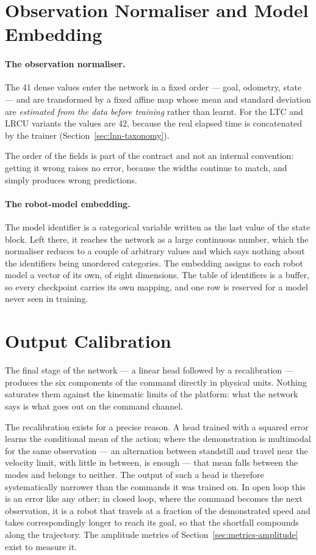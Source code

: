\section{Observation Normaliser and Model Embedding}
\label{sec:aux-modules}

\paragraph{The observation normaliser.}
The \num{41} dense values enter the network in a fixed order --- goal, odometry,
state --- and are transformed by a fixed affine map whose mean and standard
deviation are \emph{estimated from the data before training} rather than learnt.
For the LTC and LRCU variants the values are \num{42}, because the real elapsed
time is concatenated by the trainer (Section~\ref{sec:lnn-taxonomy}).

The order of the fields is part of the contract and not an internal convention:
getting it wrong raises no error, because the widths continue to match, and
simply produces wrong predictions.

\paragraph{The robot-model embedding.}
The model identifier is a categorical variable written as the last value of the
state block. Left there, it reaches the network as a large continuous number,
which the normaliser reduces to a couple of arbitrary values and which says
nothing about the identifiers being unordered categories. The embedding assigns
to each robot model a vector of its own, of eight dimensions. The table of
identifiers is a buffer, so every checkpoint carries its own mapping, and one
row is reserved for a model never seen in training.

\section{Output Calibration}
\label{sec:output-calibration}

The final stage of the network --- a linear head followed by a recalibration ---
produces the six components of the command directly in physical units. Nothing
saturates them against the kinematic limits of the platform: what the network
says is what goes out on the command channel.

The recalibration exists for a precise reason. A head trained with a squared
error learns the conditional mean of the action; where the demonstration is
multimodal for the same observation --- an alternation between standstill and
travel near the velocity limit, with little in between, is enough --- that mean
falls between the modes and belongs to neither. The output of such a head is
therefore systematically narrower than the commands it was trained on. In open
loop this is an error like any other; in closed loop, where the command becomes
the next observation, it is a robot that travels at a fraction of the
demonstrated speed and takes correspondingly longer to reach its goal, so that
the shortfall compounds along the trajectory. The amplitude metrics of
Section~\ref{sec:metrics-amplitude} exist to measure it.

